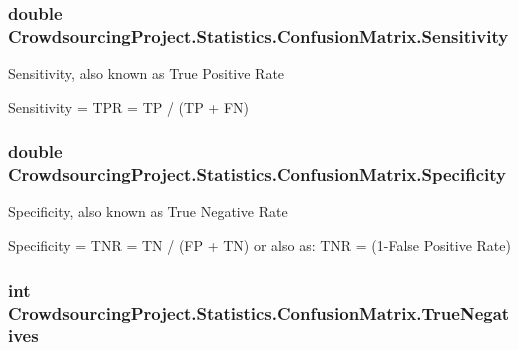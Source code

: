 \subsubsection[{Sensitivity}]{\setlength{\rightskip}{0pt plus 5cm}double Crowdsourcing\+Project.\+Statistics.\+Confusion\+Matrix.\+Sensitivity\hspace{0.3cm}{\ttfamily [get]}}\label{class_crowdsourcing_project_1_1_statistics_1_1_confusion_matrix_ac8c37fcc9f7bc87122cfb030ef4039a1}


Sensitivity, also known as True Positive Rate 

Sensitivity = T\+P\+R = T\+P / (T\+P + F\+N) \hypertarget{class_crowdsourcing_project_1_1_statistics_1_1_confusion_matrix_a214f269cbfeb96d7e50f013fd8e64c5c}{}
\subsubsection[{Specificity}]{\setlength{\rightskip}{0pt plus 5cm}double Crowdsourcing\+Project.\+Statistics.\+Confusion\+Matrix.\+Specificity\hspace{0.3cm}{\ttfamily [get]}}\label{class_crowdsourcing_project_1_1_statistics_1_1_confusion_matrix_a214f269cbfeb96d7e50f013fd8e64c5c}


Specificity, also known as True Negative Rate 

Specificity = T\+N\+R = T\+N / (F\+P + T\+N) or also as\+: T\+N\+R = (1-\/\+False Positive Rate) \hypertarget{class_crowdsourcing_project_1_1_statistics_1_1_confusion_matrix_a76af45bf60135f1f3d6cf64392be49c8}{}
\subsubsection[{True\+Negatives}]{\setlength{\rightskip}{0pt plus 5cm}int Crowdsourcing\+Project.\+Statistics.\+Confusion\+Matrix.\+True\+Negatives\hspace{0.3cm}{\ttfamily [get]}}\label{class_crowdsourcing_project_1_1_statistics_1_1_confusion_matrix_a76af45bf60135f1f3d6cf64392be49c8}


